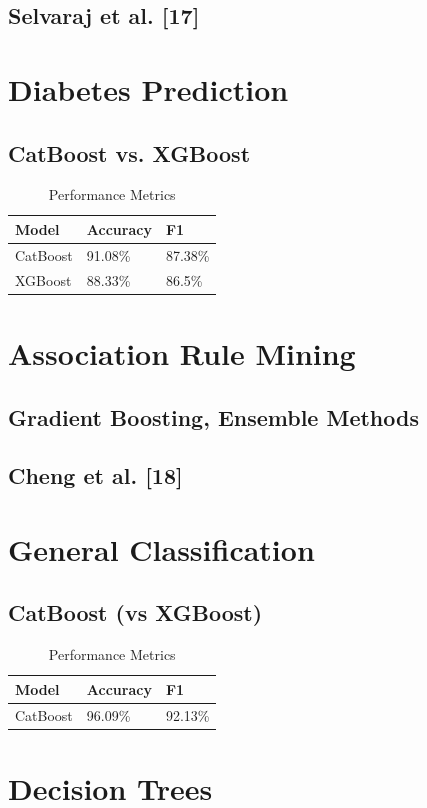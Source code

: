 \documentclass[twocolumn]{svjour3}
\begin{document}
\subsection{Selvaraj et al. [17]}
\section{Diabetes Prediction}
\subsection{CatBoost vs. XGBoost}
\begin{table}
\centering
\caption{Performance Metrics}
\begin{tabular}{lll}
\hline
Model & Accuracy & F1 \\
\hline
CatBoost & 91.08\% & 87.38\% \\
XGBoost & 88.33\% & 86.5\% \\
\hline
\end{tabular}
\end{table}
\section{Association Rule Mining}
\subsection{Gradient Boosting, Ensemble Methods}
\subsection{Cheng et al. [18]}
\section{General Classification}
\subsection{CatBoost (vs XGBoost)}
\begin{table}
\centering
\caption{Performance Metrics}
\begin{tabular}{lll}
\hline
Model & Accuracy & F1 \\
\hline
CatBoost & 96.09\% & 92.13\% \\
\hline
\end{tabular}
\end{table}
\section{Decision Trees}
\end{document}
